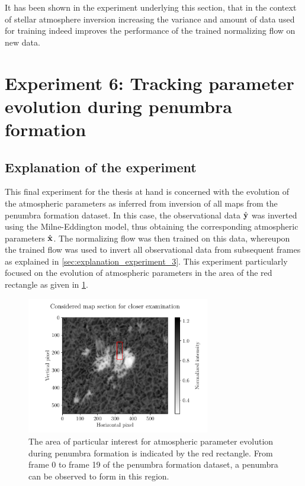 \documentclass[a4paper,12pt]{report}
\begin{document}
It has been shown in the experiment underlying this section, that in the context of stellar atmosphere inversion increasing the variance and amount of data used for training indeed improves the performance of the trained normalizing flow on new data.

\FloatBarrier
\section{Experiment 6: Tracking parameter evolution during penumbra formation}
\subsection{Explanation of the experiment}
This final experiment for the thesis at hand is concerned with the evolution of the atmospheric parameters as inferred from inversion of all maps from the penumbra formation dataset. In this case, the observational data $\hat{\boldsymbol{\mathbf{y}}}$ was inverted using the Milne-Eddington model, thus obtaining the corresponding atmospheric parameters $\hat{\boldsymbol{\mathbf{x}}}$. The normalizing flow was then trained on this data, whereupon the trained flow was used to invert all observational data from subsequent frames as explained in \cref{sec:explanation_experiment_3}. This experiment particularly focused on the evolution of atmospheric parameters in the area of the red rectangle as given in \cref{fig:nf-milne-eddington-example-7-considered-map-section-nflows-piecewisequadratic}.
\begin{figure}[h]
\centering
\includegraphics[width=8cm]{figures/nf-milne-eddington-example-7-considered-map-section-nflows-piecewisequadratic.pdf}
\caption{The area of particular interest for atmospheric parameter evolution during penumbra formation is indicated by the red rectangle. From frame 0 to frame 19 of the penumbra formation dataset, a penumbra can be observed to form in this region.}
\label{fig:nf-milne-eddington-example-7-considered-map-section-nflows-piecewisequadratic}
\end{figure}
\end{document}
